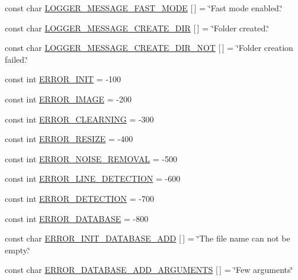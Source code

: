 \begin{DoxyCompactItemize}
\item 
const char \mbox{\hyperlink{namespaceyenot_a23d265aa1784a96ebe7ce76bedd308a6}{L\+O\+G\+G\+E\+R\+\_\+\+M\+E\+S\+S\+A\+G\+E\+\_\+\+F\+A\+S\+T\+\_\+\+M\+O\+DE}} \mbox{[}$\,$\mbox{]} = \char`\"{}Fast mode enabled.\char`\"{}
\item 
const char \mbox{\hyperlink{namespaceyenot_ace626bb1b7477b39cf2864aa0d0924e9}{L\+O\+G\+G\+E\+R\+\_\+\+M\+E\+S\+S\+A\+G\+E\+\_\+\+C\+R\+E\+A\+T\+E\+\_\+\+D\+IR}} \mbox{[}$\,$\mbox{]} = \char`\"{}Folder created.\char`\"{}
\item 
const char \mbox{\hyperlink{namespaceyenot_ae73ee066dad5c6455cb406ab3aa0473f}{L\+O\+G\+G\+E\+R\+\_\+\+M\+E\+S\+S\+A\+G\+E\+\_\+\+C\+R\+E\+A\+T\+E\+\_\+\+D\+I\+R\+\_\+\+N\+OT}} \mbox{[}$\,$\mbox{]} = \char`\"{}Folder creation failed.\char`\"{}
\item 
const int \mbox{\hyperlink{namespaceyenot_a8206ed93e65c9e89395c2823a5f18786}{E\+R\+R\+O\+R\+\_\+\+I\+N\+IT}} = -\/100
\item 
const int \mbox{\hyperlink{namespaceyenot_a3c1c146cfa3fc68ce0e1950b93270849}{E\+R\+R\+O\+R\+\_\+\+I\+M\+A\+GE}} = -\/200
\item 
const int \mbox{\hyperlink{namespaceyenot_a9b11e5890ebee4b3ace81f058483b7af}{E\+R\+R\+O\+R\+\_\+\+C\+L\+E\+A\+R\+N\+I\+NG}} = -\/300
\item 
const int \mbox{\hyperlink{namespaceyenot_a787166b1304265d12d6ff10b175a66bc}{E\+R\+R\+O\+R\+\_\+\+R\+E\+S\+I\+ZE}} = -\/400
\item 
const int \mbox{\hyperlink{namespaceyenot_a0699d20f9a904f7faf8b63cc7fc31c63}{E\+R\+R\+O\+R\+\_\+\+N\+O\+I\+S\+E\+\_\+\+R\+E\+M\+O\+V\+AL}} = -\/500
\item 
const int \mbox{\hyperlink{namespaceyenot_ab63291c5dfdea5865dc7a32401095215}{E\+R\+R\+O\+R\+\_\+\+L\+I\+N\+E\+\_\+\+D\+E\+T\+E\+C\+T\+I\+ON}} = -\/600
\item 
const int \mbox{\hyperlink{namespaceyenot_af6dc289a999d852dd3da0134f47cda0f}{E\+R\+R\+O\+R\+\_\+\+D\+E\+T\+E\+C\+T\+I\+ON}} = -\/700
\item 
const int \mbox{\hyperlink{namespaceyenot_a34fbed9d403672deb1f0f73139f26ee6}{E\+R\+R\+O\+R\+\_\+\+D\+A\+T\+A\+B\+A\+SE}} = -\/800
\item 
const char \mbox{\hyperlink{namespaceyenot_af958287fcf5b41e632a87bd1a795c74b}{E\+R\+R\+O\+R\+\_\+\+I\+N\+I\+T\+\_\+\+D\+A\+T\+A\+B\+A\+S\+E\+\_\+\+A\+DD}} \mbox{[}$\,$\mbox{]} = \char`\"{}The file name can not be empty.\char`\"{}
\item 
const char \mbox{\hyperlink{namespaceyenot_adec37b1319feb436842ed87c9741df97}{E\+R\+R\+O\+R\+\_\+\+D\+A\+T\+A\+B\+A\+S\+E\+\_\+\+A\+D\+D\+\_\+\+A\+R\+G\+U\+M\+E\+N\+TS}} \mbox{[}$\,$\mbox{]} = \char`\"{}Few arguments\char`\"{}

\end{DoxyCompactItemize}
